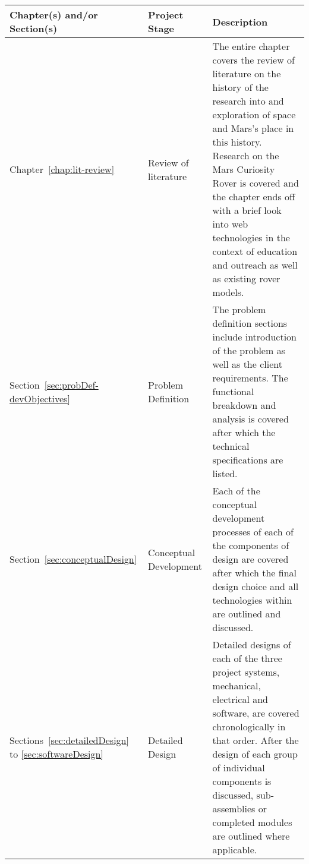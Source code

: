   \begin{longtable}{@{}L{0.15\textwidth}L{0.2\textwidth}L{0.6\textwidth}@{}}
  \toprule
  \textbf{Chapter(s) and/or Section(s)}                                                       & \textbf{Project Stage}                             & \textbf{Description}                                                                                                                                                                                                                                                                                                                                                                                            \\ \midrule
  Chapter~\ref{chap:lit-review}                                                    & Review of literature                      & The entire chapter covers the review of literature on the history of the research into and exploration of space and Mars's place in this history. Research on the Mars Curiosity Rover is covered and the chapter ends off with a brief look into web technologies in the context of education and outreach as well as existing rover models.                                                          \\ \midrule
  Section~\ref{sec:probDef-devObjectives}                                          & Problem Definition                        & The problem definition sections include introduction of the problem as well as the client requirements. The functional breakdown and analysis is covered after which the technical specifications are listed.                                                                                                                                                                                          \\ \midrule
  Section~\ref{sec:conceptualDesign}                                               & Conceptual Development                    & Each of the conceptual development processes of each of the components of design are covered after which the final design choice and all technologies within are outlined and discussed.                                                                                                                                                                                                               \\ \midrule
  Sections~\ref{sec:detailedDesign} to \ref{sec:softwareDesign}                  & Detailed Design                           & Detailed designs of each of the three project systems, mechanical, electrical and software, are covered chronologically in that order. After the design of each group of individual components is discussed, sub-assemblies or completed modules are outlined where applicable.                                                                                                                        \\ \midrule

\end{longtable}
